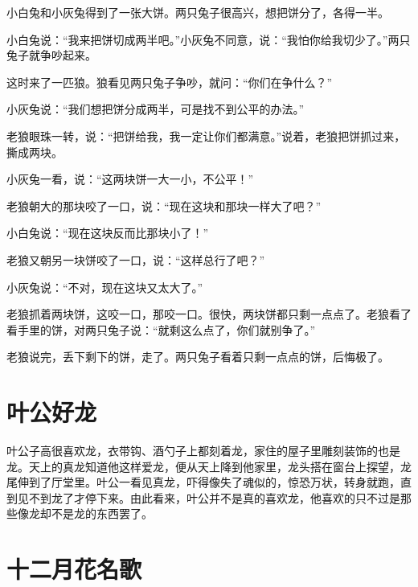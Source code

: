 \documentclass[12pt,UTF-8,openany]{ctexbook}
\begin{document}
\begin{large}
    
    小白兔和小灰兔得到了一张大饼。两只兔子很高兴，想把饼分了，各得一半。
    
    小白兔说：“我来把饼切成两半吧。”小灰兔不同意，说：“我怕你给我切少了。”两只兔子就争吵起来。
    
    这时来了一匹狼。狼看见两只兔子争吵，就问：“你们在争什么？”
    
    小灰兔说：“我们想把饼分成两半，可是找不到公平的办法。”
    
    老狼眼珠一转，说：“把饼给我，我一定让你们都满意。”说着，老狼把饼抓过来，撕成两块。
    
    小灰兔一看，说：“这两块饼一大一小，不公平！”
    
    老狼朝大的那块咬了一口，说：“现在这块和那块一样大了吧？”
    
    小白兔说：“现在这块反而比那块小了！”
    
    老狼又朝另一块饼咬了一口，说：“这样总行了吧？”
    
    小灰兔说：“不对，现在这块又太大了。”
    
    老狼抓着两块饼，这咬一口，那咬一口。很快，两块饼都只剩一点点了。老狼看了看手里的饼，对两只兔子说：“就剩这么点了，你们就别争了。”
    
    老狼说完，丢下剩下的饼，走了。两只兔子看着只剩一点点的饼，后悔极了。
    
\end{large}



\chapter{叶公好龙}

\begin{large}
    
    叶公子高很喜欢龙，衣带钩、酒勺子上都刻着龙，家住的屋子里雕刻装饰的也是龙。天上的真龙知道他这样爱龙，便从天上降到他家里，龙头搭在窗台上探望，龙尾伸到了厅堂里。叶公一看见真龙，吓得像失了魂似的，惊恐万状，转身就跑，直到见不到龙了才停下来。由此看来，叶公并不是真的喜欢龙，他喜欢的只不过是那些像龙却不是龙的东西罢了。
    
\end{large}



\chapter{十二月花名歌}
\end{document}
